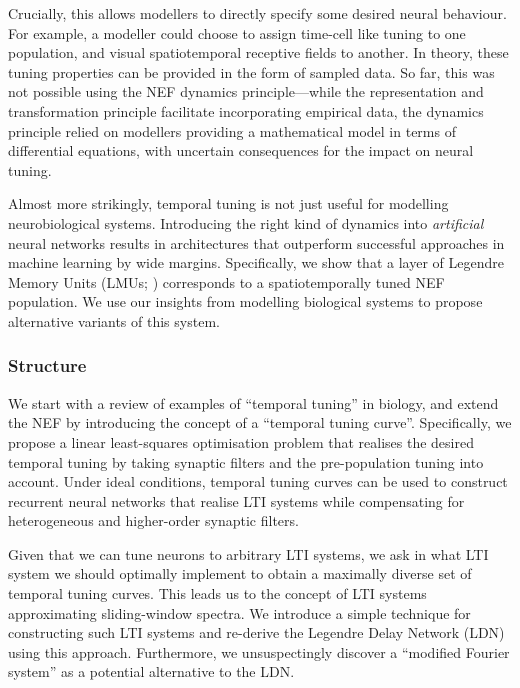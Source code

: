 Crucially, this allows modellers to directly specify some desired neural behaviour.
For example, a modeller could choose to assign time-cell like tuning \citep{pastalkova2008internally,tiganj2016sequential} to one population, and visual spatiotemporal receptive fields \citep{carandini1999linearity} to another.
In theory, these tuning properties can be provided in the form of sampled data.
So far, this was not possible using the NEF dynamics principle---while the representation and transformation principle facilitate incorporating empirical data, the dynamics principle relied on modellers providing a mathematical model in terms of differential equations, with uncertain consequences for the impact on neural tuning.

Almost more strikingly, temporal tuning is not just useful for modelling neurobiological systems.
Introducing the right kind of dynamics into \emph{artificial} neural networks results in architectures that outperform successful approaches in machine learning by wide margins.
Specifically, we show that a layer of Legendre Memory Units (LMUs; \cite{voelker2019lmu}) corresponds to a spatiotemporally tuned NEF population. We use our insights from modelling biological systems to propose alternative variants of this system.

\subsubsection{Structure}
We start  with a review of examples of \enquote{temporal tuning} in biology, and extend the NEF by introducing the concept of a \enquote{temporal tuning curve}.
Specifically, we propose a linear least-squares optimisation problem that realises the desired temporal tuning by taking synaptic filters and the pre-population tuning into account.
Under ideal conditions, temporal tuning curves can be used to construct recurrent neural networks that realise LTI systems while compensating for heterogeneous and higher-order synaptic filters.

Given that we can tune neurons to arbitrary LTI systems, we ask in  what LTI system we should optimally implement to obtain a maximally diverse set of temporal tuning curves.
This leads us to the concept of LTI systems approximating sliding-window spectra.
We introduce a simple technique for constructing such LTI systems and re-derive the Legendre Delay Network (LDN) using this approach.
Furthermore, we unsuspectingly discover a \enquote{modified Fourier system} as a potential alternative to the LDN.

